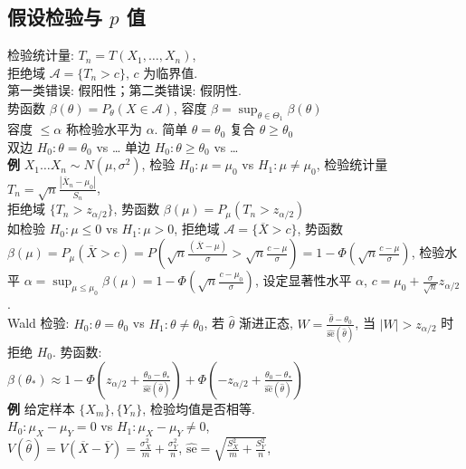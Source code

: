 \documentclass[a4paper, landscape,10pt]{article}
\begin{document}
\begin{multicols}{4}
\newcolumn

\section{假设检验与 $p$ 值}
检验统计量: $T_n = T(X_1, \dots, X_n)$, \\
拒绝域 $\mathcal{A} = \{T_n > c\}$, $c$ 为临界值. \\
第一类错误: 假阳性；第二类错误: 假阴性. \\
势函数 $\beta(\theta) = P_\theta(X\in \mathcal{A})$, 容度 $\beta = \sup_{\theta \in \Theta_1} \beta(\theta)$\\
容度 $\leq \alpha$ 称检验水平为 $\alpha$. 简单 $\theta = \theta_0$ 复合 $\theta \geq \theta_0$ \\
双边 $H_0 : \theta = \theta_0$ vs \dots
单边 $H_0 : \theta \geq \theta_0$ vs \dots\\
{\bfseries 例} $X_1 \dots X_n \sim N(\mu, \sigma^2)$, 检验 $H_0 : \mu = \mu_0$ vs $H_1 : \mu \neq \mu_0$,
检验统计量 $T_n = \sqrt{n} \frac{|\overline X_n - \mu_0|}{S_n}$, \\
拒绝域 $\{T_n > z_{\alpha/2}\}$,
势函数 $\beta(\mu) = P_\mu(T_n > z_{\alpha/2})$\\
如检验 $H_0: \mu \leq 0$ vs $H_1: \mu > 0$,
拒绝域 $\mathcal{A} = \{\overline X > c\}$,
势函数 $\beta(\mu) = P_\mu(\overline X > c) = P(\sqrt{n}\frac {(\overline X - \mu)} {\sigma} > \sqrt{n} \frac {c - \mu} {\sigma}) = 1 - \Phi(\sqrt{n} \frac {c - \mu} {\sigma})$,
检验水平 $\alpha = \sup_{\mu \leq \mu_0} \beta(\mu) = 1 - \Phi(\sqrt{n} \frac {c - \mu_0} {\sigma})$,
设定显著性水平 $\alpha$, $c=\mu_0 + \frac{\sigma}{\sqrt{n}} z_{\alpha / 2}$. \\
Wald 检验: $H_0: \theta = \theta_0$ vs $H_1: \theta \neq \theta_0$,
若 $\hat \theta$ 渐进正态, $W = \frac{\hat \theta - \theta_0}{\hat {\mathrm{se}}(\hat \theta)}$, 当 $|W| > z_{\alpha / 2}$ 时拒绝 $H_0$. 势函数: \\
$\beta(\theta_*)\approx
1 - \Phi(z_{\alpha / 2} + \frac{\theta_0 - \theta_*}{\hat {\mathrm{se}}(\hat \theta)})
+\Phi(-z_{\alpha / 2} + \frac{\theta_0 - \theta_*}{\hat {\mathrm{se}}(\hat \theta)})$\\
{\bfseries 例} 给定样本 $\{X_m\}, \{Y_n\}$, 检验均值是否相等. \\
$H_0: \mu_X - \mu_Y = 0$ vs $H_1: \mu_X - \mu_Y \neq 0$, \\
$V(\hat \theta) = V(\overline X - \overline Y) = \frac{\sigma_X^2}{m} + \frac{\sigma_Y^2}{n}$, 
$\hat {\mathrm{se}} = \sqrt{\frac{S_X^2}{m} + \frac{S_Y^2}{n}}$, \\

\end{multicols}
\end{document}
